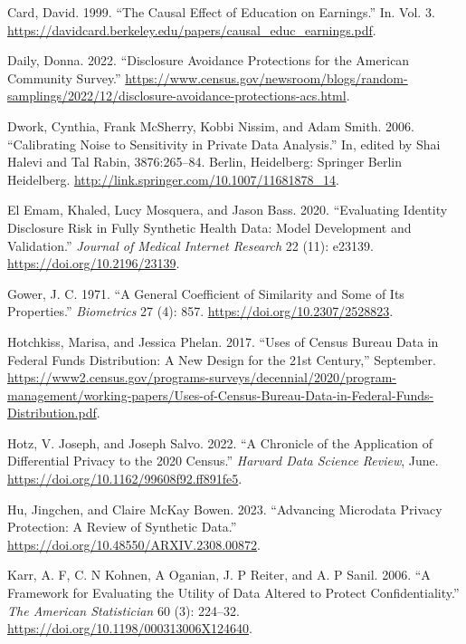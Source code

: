 \documentclass[
]{urban-formatting}
\newlength{\cslhangindent}
\newlength{\cslentryspacingunit} %
\newenvironment{CSLReferences}[2] %
 {%
  \setlength{\parindent}{0pt}
  \ifodd #1
  \let\oldpar\par
  \def\par{\hangindent=\cslhangindent\oldpar}
  \fi
  \setlength{\parskip}{#2\cslentryspacingunit}
 }%
 {}
\begin{document}
\begin{CSLReferences}{1}{0}
\leavevmode{}%
Card, David. 1999. {``The Causal Effect of Education on Earnings.''} In.
Vol. 3.
\url{https://davidcard.berkeley.edu/papers/causal_educ_earnings.pdf}.

\leavevmode{}%
Daily, Donna. 2022. {``Disclosure Avoidance Protections for the American
Community Survey.''}
\url{https://www.census.gov/newsroom/blogs/random-samplings/2022/12/disclosure-avoidance-protections-acs.html}.

\leavevmode{}%
Dwork, Cynthia, Frank McSherry, Kobbi Nissim, and Adam Smith. 2006.
{``Calibrating Noise to Sensitivity in Private Data Analysis.''} In,
edited by Shai Halevi and Tal Rabin, 3876:265--84. Berlin, Heidelberg:
Springer Berlin Heidelberg.
\url{http://link.springer.com/10.1007/11681878_14}.

\leavevmode{}%
El Emam, Khaled, Lucy Mosquera, and Jason Bass. 2020. {``Evaluating
Identity Disclosure Risk in Fully Synthetic Health Data: Model
Development and Validation.''} \emph{Journal of Medical Internet
Research} 22 (11): e23139. \url{https://doi.org/10.2196/23139}.

\leavevmode{}%
Gower, J. C. 1971. {``A General Coefficient of Similarity and Some of
Its Properties.''} \emph{Biometrics} 27 (4): 857.
\url{https://doi.org/10.2307/2528823}.

\leavevmode{}%
Hotchkiss, Marisa, and Jessica Phelan. 2017. {``Uses of Census Bureau
Data in Federal Funds Distribution: A New Design for the 21st
Century,''} September.
\url{https://www2.census.gov/programs-surveys/decennial/2020/program-management/working-papers/Uses-of-Census-Bureau-Data-in-Federal-Funds-Distribution.pdf}.

\leavevmode{}%
Hotz, V. Joseph, and Joseph Salvo. 2022. {``A Chronicle of the
Application of Differential Privacy to the 2020 Census.''} \emph{Harvard
Data Science Review}, June.
\url{https://doi.org/10.1162/99608f92.ff891fe5}.

\leavevmode{}%
Hu, Jingchen, and Claire McKay Bowen. 2023. {``Advancing Microdata
Privacy Protection: A Review of Synthetic Data.''}
\url{https://doi.org/10.48550/ARXIV.2308.00872}.

\leavevmode{}%
Karr, A. F, C. N Kohnen, A Oganian, J. P Reiter, and A. P Sanil. 2006.
{``A Framework for Evaluating the Utility of Data Altered to Protect
Confidentiality.''} \emph{The American Statistician} 60 (3): 224--32.
\url{https://doi.org/10.1198/000313006X124640}.


\end{CSLReferences}
\end{document}
